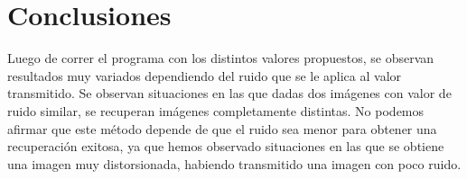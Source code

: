 \documentclass[10pt,journal,compsoc]{IEEEtran}
\begin{document}
\section{Conclusiones}

Luego de correr el programa con los distintos valores propuestos, se observan resultados muy variados dependiendo del ruido que se le aplica al valor transmitido. Se observan situaciones en las que dadas dos im\'agenes con valor de ruido similar, se recuperan im\'agenes completamente distintas. No podemos afirmar que este m\'etodo depende de que el ruido sea menor para obtener una recuperaci\'on exitosa, ya que hemos observado situaciones en las que se obtiene una imagen muy distorsionada, habiendo transmitido una imagen con poco ruido.\\







%



\end{document}
